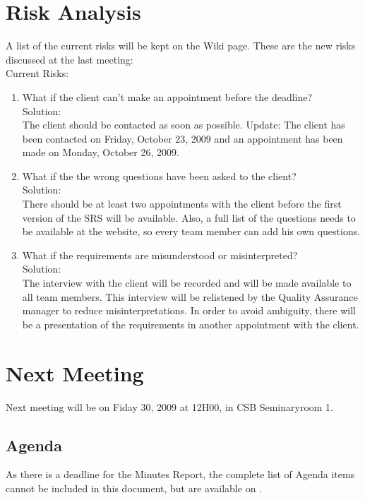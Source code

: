 \documentclass[a4paper, 12pt]{article}
\begin{document}
	\section{Risk Analysis}
A list of the current risks will be kept on the Wiki page. These are the new risks discussed at the last meeting:\\
	Current Risks:
		\begin{enumerate}
		\item What if the client can't make an appointment before the deadline? \\
		Solution:\\
The client should be contacted as soon as possible. Update: The client has been contacted on Friday, October 23, 2009 and an appointment has been made on Monday, October 26, 2009.
		\item What if the the wrong questions have been asked to the client?\\
		Solution:\\
There should be at least two appointments with the client before the first version of the SRS will be available. Also, a full list of the questions\cite{site3} needs to be available at the website, so every team member can add his own questions.
		\item What if the requirements are misunderstood or misinterpreted?\\
		Solution:\\
The interview with the client will be recorded and will be made available to all team members. This interview will be relistened by the Quality Assurance manager to reduce misinterpretations. In order to avoid ambiguity, there will be a presentation of the requirements in another appointment with the client.
		\end{enumerate}



	\section{Next Meeting}
	
	Next meeting will be on Fiday 30, 2009 at 12H00, in CSB Seminaryroom 1. 
	
	
	\subsection{Agenda}
	As there is a deadline for the Minutes Report, the complete list of Agenda items cannot be included in this document, but are available on \cite{site4}.
\end{document}
